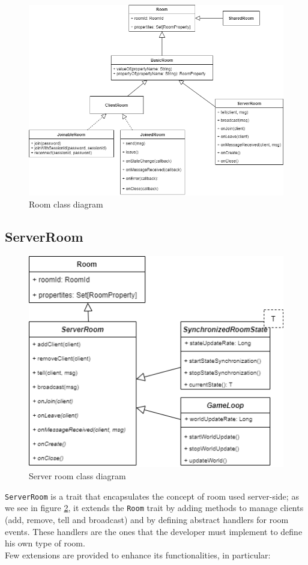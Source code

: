 \begin{figure}
	\centering
	\includegraphics[scale=0.5]{images/4-design/room-class.png}
	\caption{Room class diagram}
	\label{fig:room_class_diagram}
\end{figure}

\subsection{ServerRoom}
\begin{figure}
	\centering
	\includegraphics[scale=0.5]{images/4-design/server-room.png}
	\caption{Server room class diagram}
	\label{fig:server_room_class_diagram}
\end{figure}

\texttt{ServerRoom} is a trait that encapsulates the concept of room used server-side; as we see in figure \ref{fig:server_room_class_diagram}, it extends the \texttt{Room} trait by adding methods to manage clients (add, remove, tell and broadcast) and by defining abstract handlers for room events. These handlers are the ones that the developer must implement to define his own type of room.
\\
Few extensions are provided to enhance its functionalities, in particular:

